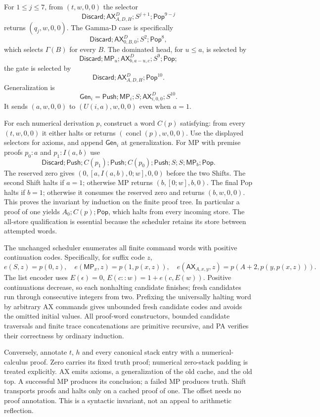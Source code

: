 For $1\le j\le7$, from $(t,w,0,0)$ the selector
\[
 \mathsf{Discard};\mathsf{AX}^{D}_{A,D,H};S^{j+1};\mathsf{Pop}^{9-j}
\]
returns $(q_j,w,0,0)$. The Gamma-D case is specifically
\[
 \mathsf{Discard};\mathsf{AX}^{D}_{0,B,0};S^2;\mathsf{Pop}^{8},
\]
which selects $\Gamma(B)$ for every $B$. The dominated head, for $u\le a$,
is selected by
\[
 \mathsf{Discard};\mathsf{MP}_u;\mathsf{AX}^{D}_{b,a-u,c};S^9;\mathsf{Pop};
\]
the gate is selected by
\[
 \mathsf{Discard};\mathsf{AX}^{D}_{A,D,H};\mathsf{Pop}^{10}.
\]
Generalization is
\[
 \mathsf{Gen}_i=\mathsf{Push};\mathsf{MP}_i;S;
                  \mathsf{AX}^{D}_{i,0,0};S^{10}.
\]
It sends $(a,w,0,0)$ to $(U(i,a),w,0,0)$ even when $a=1$.

For each numerical derivation $p$, construct a word $C(p)$ satisfying:
from every $(t,w,0,0)$ it either halts or returns
$(\operatorname{concl}(p),w,0,0)$. Use the displayed selectors for axioms,
and append $\mathsf{Gen}_i$ at generalization. For MP with premise
proofs $p_0:a$ and $p_1:I(a,b)$ use
\[
 \mathsf{Discard};\mathsf{Push};C(p_1);\mathsf{Push};C(p_0);
 \mathsf{Push};S;S;\mathsf{MP}_b;\mathsf{Pop}.
\]
The reserved zero gives $(0,[a,I(a,b),0;w],0,0)$ before the two Shifts.
The second Shift halts if $a=1$; otherwise MP returns
$(b,[0;w],b,0)$. The final Pop halts if $b=1$; otherwise it consumes the
reserved zero and returns $(b,w,0,0)$. This proves the invariant by
induction on the finite proof tree. In particular a proof of one yields
$A_0;C(p);\mathsf{Pop}$, which halts from every incoming store.
The all-store qualification is essential because the scheduler retains
its store between attempted words.

The unchanged scheduler enumerates all finite command words with positive
continuation codes. Specifically, for suffix code $z$,
\[
 e(S,z)=p(0,z),\quad e(\mathsf{MP}_x,z)=p(1,p(x,z)),\quad
 e(\mathsf{AX}_{A,x,y},z)=p(A+2,p(y,p(x,z))).
\]
The list encoder uses $E(\epsilon)=0$, $E(c::w)=1+e(c,E(w))$.
Positive continuations decrease, so each nonhalting candidate finishes;
fresh candidates run through consecutive integers from two. Prefixing
the universally halting word by arbitrary AX commands gives unbounded
fresh candidate codes and avoids the omitted initial values.
All proof-word constructors, bounded candidate traversals and finite
trace concatenations are primitive recursive, and PA verifies their
correctness by ordinary induction.

Conversely, annotate $t$, $h$ and every canonical stack entry with a
numerical-calculus proof. Zero carries its fixed truth proof; numerical
zero-stack padding is treated explicitly. AX emits axioms, a generalization
of the old cache, and the old top. A successful MP produces its conclusion;
a failed MP produces truth. Shift transports proofs and halts only on a
cached proof of one. The offset needs no proof annotation. This is a
syntactic invariant, not an appeal to arithmetic reflection.

